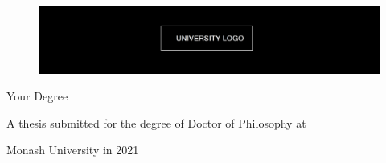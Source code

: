 \documentclass[
12pt, twoside, %
english, %
onehalfspacing, %
liststotoc, %
parskip, %
chapterinoneline, %
]{MastersDoctoralThesis} %
\author{Your Name} %
\begin{document}
\frontmatter %

\pagestyle{plain} %


\begin{titlepage}
	\begin{center}
		
		
		\begin{figure}
			\centering
			\includegraphics[width=\linewidth]{Figures/logo.png} %
		\end{figure}
		
	    \vspace{5cm}
		{ \Large \textbf{\ttitle}\par}%
		\vspace{1cm}
		{{\large \authorname}}
		
		{\small Your Degree}			\\[0.4cm]
		
		\vspace{1cm}

		\large A thesis submitted for the degree of Doctor of Philosophy at  %

        \large Monash University in 2021 \\[0.5cm]
		\small
		\groupname\\
		\deptname\\
		\facname\\[2cm] %
		

\end{center}
\end{titlepage}
\end{document}
